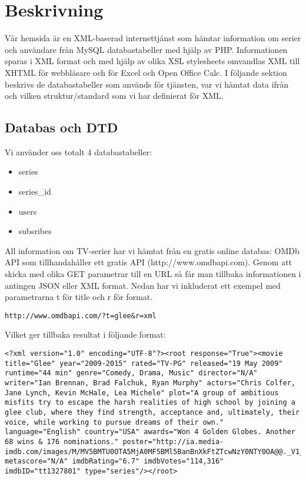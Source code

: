 \chapter{Beskrivning}

Vår hemsida är en XML-baserad internettjänst som hämtar information om serier och användare från MySQL databastabeller med hjälp av PHP. Informationen sparas i XML format och med hjälp av olika XSL stylesheets omvandlas XML till XHTML för webbläsare och för Excel och Open Office Calc. I följande sektion beskrivs de databastabeller som används för tjänsten, var vi hämtat data ifrån och vilken struktur/standard som vi har definierat för XML.

\section{Databas och DTD}
Vi använder oss totalt 4 databastabeller:
\begin{itemize}
\item series
\item series\_id
\item users
\item subsribes
\end{itemize}
All information om TV-serier har vi hämtat från en gratis online databas: OMDb API som tillhandahåller ett gratis API (http://www.omdbapi.com). Genom att skicka med olika GET parametrar till en URL så får man tillbaka informationen i antingen JSON eller XML format. Nedan har vi inkluderat ett exempel med parametrarna t för title och r för format.  

\begin{lstlisting}
http://www.omdbapi.com/?t=glee&r=xml
\end{lstlisting}
Vilket ger tillbaka resultat i följande format:
\begin{lstlisting}
<?xml version="1.0" encoding="UTF-8"?><root response="True"><movie title="Glee" year="2009-2015" rated="TV-PG" released="19 May 2009" runtime="44 min" genre="Comedy, Drama, Music" director="N/A" writer="Ian Brennan, Brad Falchuk, Ryan Murphy" actors="Chris Colfer, Jane Lynch, Kevin McHale, Lea Michele" plot="A group of ambitious misfits try to escape the harsh realities of high school by joining a glee club, where they find strength, acceptance and, ultimately, their voice, while working to pursue dreams of their own." language="English" country="USA" awards="Won 4 Golden Globes. Another 68 wins & 176 nominations." poster="http://ia.media-imdb.com/images/M/MV5BMTU0OTA5MjA0MF5BMl5BanBnXkFtZTcwNzY0NTY0OA@@._V1_SX300.jpg" metascore="N/A" imdbRating="6.7" imdbVotes="114,316" imdbID="tt1327801" type="series"/></root>
\end{lstlisting}

